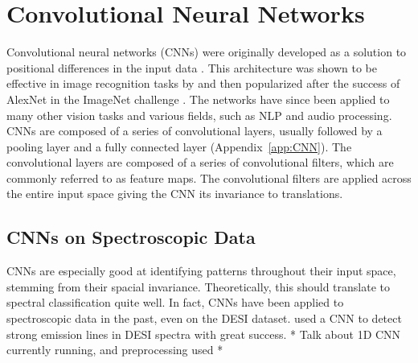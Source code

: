 \section{Convolutional Neural Networks}\label{sec:CNN}
Convolutional neural networks (CNNs) were originally developed as a solution 
to positional differences in the input data \parencite{fukushima1979}. This architecture 
was shown to be effective in image recognition tasks by \textcite{lecun2004} and then popularized after the success of AlexNet in the 
ImageNet challenge \textcite{krizhevsky2012}. The networks have since been applied to
many other vision tasks and various fields, such as NLP and audio processing. 
CNNs are composed of a series of convolutional layers, usually followed by a 
pooling layer and a fully connected layer (Appendix~\ref{app:CNN}). The convolutional layers are composed of a series of convolutional filters, which are commonly referred to as feature maps.
The convolutional filters are applied across the entire input space giving the CNN its invariance to translations.

\subsection{CNNs on Spectroscopic Data}
\label{sec:CNNspectra}
CNNs are especially good at identifying patterns throughout their input space, stemming from their spacial invariance. Theoretically, this should translate to spectral classification quite well. In fact, CNNs have been applied 
to spectroscopic data in the past, even on the DESI dataset. 
\textcite{parks2018} used a CNN to detect strong emission lines in DESI spectra with 
great success. * Talk about 1D CNN currently running, and preprocessing used *

